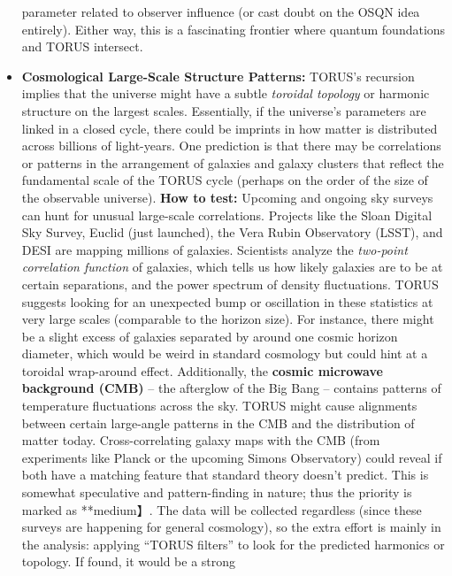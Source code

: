 \documentclass[
]{article}
\begin{document}
\begin{itemize}
  parameter related to observer influence (or cast doubt on the OSQN
  idea entirely). Either way, this is a fascinating frontier where
  quantum foundations and TORUS intersect.
\item
  \textbf{Cosmological Large-Scale Structure Patterns:} TORUS's
  recursion implies that the universe might have a subtle \emph{toroidal
  topology} or harmonic structure on the largest scales. Essentially, if
  the universe's parameters are linked in a closed cycle, there could be
  imprints in how matter is distributed across billions of light-years.
  One prediction is that there may be correlations or patterns in the
  arrangement of galaxies and galaxy clusters that reflect the
  fundamental scale of the TORUS cycle (perhaps on the order of the size
  of the observable universe). \textbf{How to test:} Upcoming and
  ongoing sky surveys can hunt for unusual large-scale correlations.
  Projects like the Sloan Digital Sky Survey, Euclid (just launched),
  the Vera Rubin Observatory (LSST), and DESI are mapping millions of
  galaxies. Scientists analyze the \emph{two-point correlation function}
  of galaxies, which tells us how likely galaxies are to be at certain
  separations, and the power spectrum of density fluctuations. TORUS
  suggests looking for an unexpected bump or oscillation in these
  statistics at very large scales (comparable to the horizon
  size)\hspace{0pt}. For instance, there might be a slight excess of
  galaxies separated by around one cosmic horizon diameter, which would
  be weird in standard cosmology but could hint at a toroidal
  wrap-around effect. Additionally, the \textbf{cosmic microwave
  background (CMB)} -- the afterglow of the Big Bang -- contains
  patterns of temperature fluctuations across the sky. TORUS might cause
  alignments between certain large-angle patterns in the CMB and the
  distribution of matter today\hspace{0pt}. Cross-correlating galaxy
  maps with the CMB (from experiments like Planck or the upcoming Simons
  Observatory) could reveal if both have a matching feature that
  standard theory doesn't predict\hspace{0pt}. This is somewhat
  speculative and pattern-finding in nature; thus the priority is marked
  as **medium】. The data will be collected regardless (since these
  surveys are happening for general cosmology), so the extra effort is
  mainly in the analysis: applying ``TORUS filters'' to look for the
  predicted harmonics or topology. If found, it would be a strong

\end{itemize}
\end{document}
